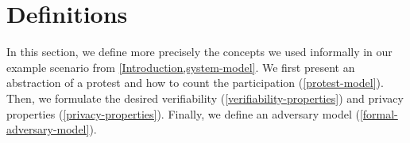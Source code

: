 \section{Definitions}
\label{definitions}
In this section, we define more precisely the concepts we used informally in our example scenario from \cref{Introduction,system-model}.
We first present an abstraction of a protest and how to count the
participation (\cref{protest-model}). Then, we formulate the desired
verifiability (\cref{verifiability-properties}) and privacy properties
(\cref{privacy-properties}).
Finally, we define an adversary model 
(\cref{formal-adversary-model}).







